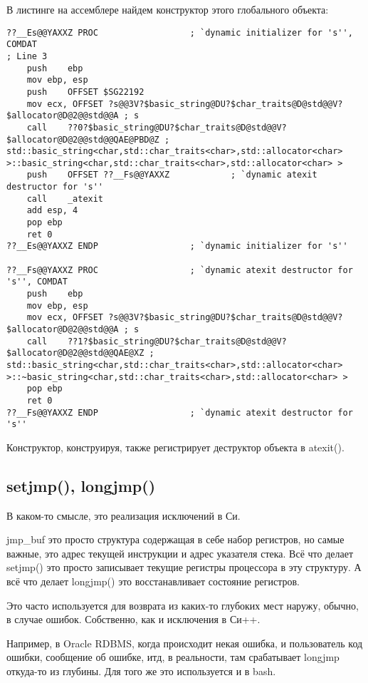 В листинге на ассемблере найдем конструктор этого глобального объекта:

\begin{lstlisting}[caption=MSVC 2010]
??__Es@@YAXXZ PROC					; `dynamic initializer for 's'', COMDAT
; Line 3
	push	ebp
	mov	ebp, esp
	push	OFFSET $SG22192
	mov	ecx, OFFSET ?s@@3V?$basic_string@DU?$char_traits@D@std@@V?$allocator@D@2@@std@@A ; s
	call	??0?$basic_string@DU?$char_traits@D@std@@V?$allocator@D@2@@std@@QAE@PBD@Z ; std::basic_string<char,std::char_traits<char>,std::allocator<char> >::basic_string<char,std::char_traits<char>,std::allocator<char> >
	push	OFFSET ??__Fs@@YAXXZ			; `dynamic atexit destructor for 's''
	call	_atexit
	add	esp, 4
	pop	ebp
	ret	0
??__Es@@YAXXZ ENDP					; `dynamic initializer for 's''

??__Fs@@YAXXZ PROC					; `dynamic atexit destructor for 's'', COMDAT
	push	ebp
	mov	ebp, esp
	mov	ecx, OFFSET ?s@@3V?$basic_string@DU?$char_traits@D@std@@V?$allocator@D@2@@std@@A ; s
	call	??1?$basic_string@DU?$char_traits@D@std@@V?$allocator@D@2@@std@@QAE@XZ ; std::basic_string<char,std::char_traits<char>,std::allocator<char> >::~basic_string<char,std::char_traits<char>,std::allocator<char> >
	pop	ebp
	ret	0
??__Fs@@YAXXZ ENDP					; `dynamic atexit destructor for 's''
\end{lstlisting}

Конструктор, конструируя, также регистрирует деструктор объекта в atexit().



\subsection{setjmp(), longjmp()}

В каком-то смысле, это реализация исключений в Си.

jmp\_buf это просто структура содержащая в себе набор регистров, но самые важные, это адрес текущей инструкции
и адрес указателя стека.
Всё что делает setjmp() это просто записывает текущие регистры процессора в эту структуру.
А всё что делает longjmp() это восстанавливает состояние регистров.

Это часто используется для возврата из каких-то глубоких мест наружу, обычно, в случае ошибок.
Собственно, как и исключения в Си++.

Например, в Oracle RDBMS, когда происходит некая ошибка, и пользователь код ошибки, сообщение об ошибке, итд,
в реальности, там срабатывает longjmp откуда-то из глубины. Для того же это используется и в bash.

